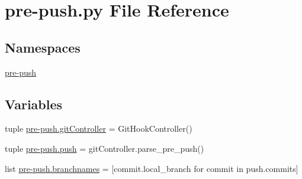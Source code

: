 \section{pre-\/push.py File Reference}
\label{pre-push_8py}
\subsection*{Namespaces}
\begin{DoxyCompactItemize}
\item 
\hyperlink{namespacepre-push}{pre-\/push}
\end{DoxyCompactItemize}
\subsection*{Variables}
\begin{DoxyCompactItemize}
\item 
tuple \hyperlink{namespacepre-push_a8c127aba641727d65b14a0f4aad44a1c}{pre-\/push.\-git\-Controller} = Git\-Hook\-Controller()
\item 
tuple \hyperlink{namespacepre-push_a71bb0fe33ffeefadee67d3dbbe085080}{pre-\/push.\-push} = git\-Controller.\-parse\-\_\-pre\-\_\-push()
\item 
list \hyperlink{namespacepre-push_a78ac8288356df9910db91d02884f211c}{pre-\/push.\-branchnames} = \mbox{[}commit.\-local\-\_\-branch for commit in push.\-commits\mbox{]}
\end{DoxyCompactItemize}
